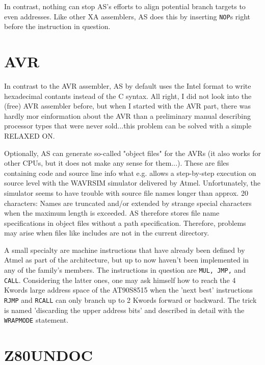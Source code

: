\documentclass[12pt,twoside]{report}
\newcommand{\tty}[1]{{\tt #1}}
\begin{document}
In contrast, nothing can stop AS's efforts to align potential branch
targets to even addresses.  Like other XA assemblers, AS does this by
inserting \tty{NOP}s right before the instruction in question.


\section{AVR}

In contrast to the AVR assembler, AS by default uses the Intel format
to write hexadecimal contants instead of the C syntax.  All right, I
did not look into the (free) AVR assembler before, but when I started
with the AVR part, there was hardly mor einformation about the AVR
than a preliminary manual describing processor types that were never
sold...this problem can be solved with a simple RELAXED ON.

Optionally, AS can generate so-called "object files" for the AVRs (it
also works for other CPUs, but it does not make any sense for them...).
These are files containing code and source line info what e.g. allows
a step-by-step execution on source level with the WAVRSIM simulator
delivered by Atmel.  Unfortunately, the simulator seems to have
trouble with source file names longer than approx. 20 characters:
Names are truncated and/or extended by strange special characters
when the maximum length is exceeded.  AS therefore stores file name
specifications in object files without a path specification. 
Therefore, problems may arise when files like includes are not in the
current directory.

A small specialty are machine instructions that have already been defined
by Atmel as part of the architecture, but up to now haven't been
implemented in any of the family's members.  The instructions in question
are {\tt MUL, JMP,} and {\tt CALL}.  Considering the latter ones, one may
ask himself how to reach the 4 Kwords large address space of the AT90S8515
when the 'next best' instructions {\tt RJMP} and {\tt RCALL} can only
branch up to 2 Kwords forward or backward.  The trick is named 'discarding
the upper address bits' and described in detail with the {\tt WRAPMODE}
statement.


\section{Z80UNDOC}
\end{document}
